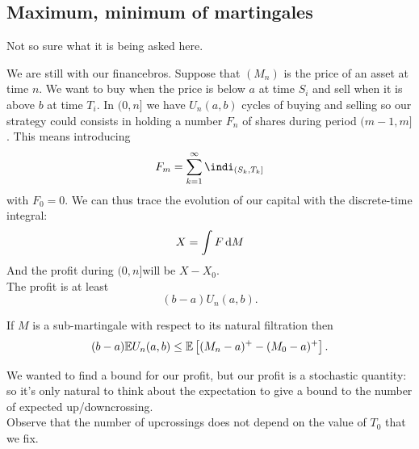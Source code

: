 \documentclass{report}
\begin{document}
\subsection{Maximum, minimum of martingales}
Not so sure what it is being asked here. \begin{example}
	We are still with our financebros. Suppose that $(M_{n})$ is the price of an asset at time $n$. We want to buy when the price is below $a$ at time $S_i$ and sell when it is above $b$ at time $T_i$. In $(0,n]$ we have $U_{n}(a,b)$ cycles of buying and selling so our strategy could consists in holding a number $F_{n}$ of shares during period $(m-1,m]$. This means introducing
	\[F_{m}=\sum_{k=1}^{\infty}\indi_{(S_{k},T_{k}]}\]
	with $F_{0}=0$. We can thus trace the evolution of our capital with the discrete-time integral:
	\[X=\int F\mathop{}\!\mathrm{d} M\]
	And the profit during $(0,n]$will be $X-X_{0}$.\\
	The profit is at least
	\begin{equation*}
		(b-a)U_{n}(a,b).
	\end{equation*}
\end{example}
\begin{proposition}
	If $M$ is a sub-martingale with respect to its natural filtration then 
	\begin{equation*}
		(b-a)\mathbb{E} U_{n}(a,b)\leq\mathbb{E}\left[(M_{n}-a)^{+}-(M_{0}-a)^{+}\right].
	\end{equation*}
\end{proposition}
We wanted to find a bound for our profit, but our profit is a stochastic quantity: so it's only natural to think about the expectation to give a bound to the number of expected up/downcrossing.\\
Observe that the number of upcrossings does not depend on the value of $T_0$ that we fix.
\end{document}
